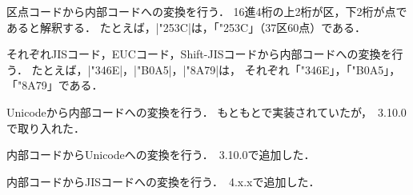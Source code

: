 \documentclass[a4paper,11pt,nomag,dvipdfmx]{jsarticle}
\begin{document}
\begin{cslist}
  区点コードから内部コードへの変換を行う．
  16進4桁の上2桁が区，下2桁が点であると解釈する．
  たとえば，|\char\kuten"253C|は，「\char\kuten"253C」（37区60点）である．

  それぞれJISコード，EUCコード，Shift-JISコードから内部コードへの変換を行う．
  たとえば，|\char\jis"346E|，|\char\euc"B0A5|，|\char\sjis"8A79|は，
  それぞれ「\char\jis"346E」，「\char\euc"B0A5」，「\char\sjis"8A79」である．

  Unicodeから内部コードへの変換を行う．
  もともと\upTeX で実装されていたが，\pTeX~3.10.0で取り入れた．

  内部コードからUnicodeへの変換を行う．\pTeX~3.10.0で追加した．

\ifx\tojis\undefined\else
%
  内部コードからJISコードへの変換を行う．\pTeX~4.x.xで追加した．
%
\fi
\end{cslist}
\end{document}
